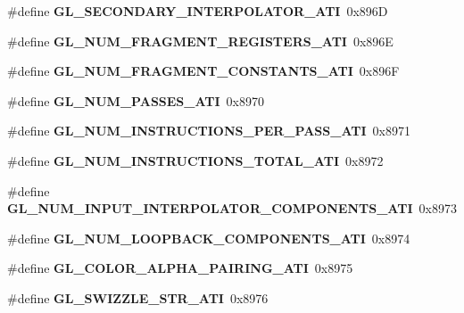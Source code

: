 \begin{DoxyCompactItemize}
\item 
\#define {\bfseries G\+L\+\_\+\+S\+E\+C\+O\+N\+D\+A\+R\+Y\+\_\+\+I\+N\+T\+E\+R\+P\+O\+L\+A\+T\+O\+R\+\_\+\+A\+T\+I}~0x896\+D\label{_s_d_l__opengl_8h_a8eebb92367d671ecb0b434cc83fa4553}

\item 
\#define {\bfseries G\+L\+\_\+\+N\+U\+M\+\_\+\+F\+R\+A\+G\+M\+E\+N\+T\+\_\+\+R\+E\+G\+I\+S\+T\+E\+R\+S\+\_\+\+A\+T\+I}~0x896\+E\label{_s_d_l__opengl_8h_a9a6f7865decb38d77c83555736f92212}

\item 
\#define {\bfseries G\+L\+\_\+\+N\+U\+M\+\_\+\+F\+R\+A\+G\+M\+E\+N\+T\+\_\+\+C\+O\+N\+S\+T\+A\+N\+T\+S\+\_\+\+A\+T\+I}~0x896\+F\label{_s_d_l__opengl_8h_a175f4de270045a93f929b7441b6245b2}

\item 
\#define {\bfseries G\+L\+\_\+\+N\+U\+M\+\_\+\+P\+A\+S\+S\+E\+S\+\_\+\+A\+T\+I}~0x8970\label{_s_d_l__opengl_8h_af026b485d7b4110f7ce152362d475598}

\item 
\#define {\bfseries G\+L\+\_\+\+N\+U\+M\+\_\+\+I\+N\+S\+T\+R\+U\+C\+T\+I\+O\+N\+S\+\_\+\+P\+E\+R\+\_\+\+P\+A\+S\+S\+\_\+\+A\+T\+I}~0x8971\label{_s_d_l__opengl_8h_aa19b5c10f0044a3169db7b1ba582ea2f}

\item 
\#define {\bfseries G\+L\+\_\+\+N\+U\+M\+\_\+\+I\+N\+S\+T\+R\+U\+C\+T\+I\+O\+N\+S\+\_\+\+T\+O\+T\+A\+L\+\_\+\+A\+T\+I}~0x8972\label{_s_d_l__opengl_8h_a81c6a72de23ef8be4e09b6c74bd02187}

\item 
\#define {\bfseries G\+L\+\_\+\+N\+U\+M\+\_\+\+I\+N\+P\+U\+T\+\_\+\+I\+N\+T\+E\+R\+P\+O\+L\+A\+T\+O\+R\+\_\+\+C\+O\+M\+P\+O\+N\+E\+N\+T\+S\+\_\+\+A\+T\+I}~0x8973\label{_s_d_l__opengl_8h_a87ff5db99f49bf47baa55dc2f68e9a61}

\item 
\#define {\bfseries G\+L\+\_\+\+N\+U\+M\+\_\+\+L\+O\+O\+P\+B\+A\+C\+K\+\_\+\+C\+O\+M\+P\+O\+N\+E\+N\+T\+S\+\_\+\+A\+T\+I}~0x8974\label{_s_d_l__opengl_8h_a6f9b02610f3280ac1c1d9bf59b97796d}

\item 
\#define {\bfseries G\+L\+\_\+\+C\+O\+L\+O\+R\+\_\+\+A\+L\+P\+H\+A\+\_\+\+P\+A\+I\+R\+I\+N\+G\+\_\+\+A\+T\+I}~0x8975\label{_s_d_l__opengl_8h_a0f555ef0089abcb38f6602b5741b3a91}

\item 
\#define {\bfseries G\+L\+\_\+\+S\+W\+I\+Z\+Z\+L\+E\+\_\+\+S\+T\+R\+\_\+\+A\+T\+I}~0x8976\label{_s_d_l__opengl_8h_a31f559b0657573e0e776fd5884aad300}


\end{DoxyCompactItemize}
